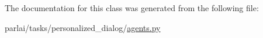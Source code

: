The documentation for this class was generated from the following file\+:\begin{DoxyCompactItemize}
\item 
parlai/tasks/personalized\+\_\+dialog/\hyperlink{parlai_2tasks_2personalized__dialog_2agents_8py}{agents.\+py}\end{DoxyCompactItemize}
